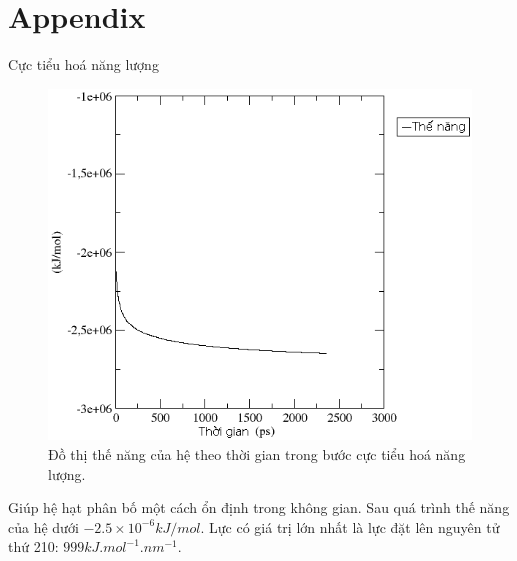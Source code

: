 \documentclass[10pt]{beamer}
\begin{document}
\section*{Appendix}
	\begin{frame}{Cực tiểu hoá năng lượng}
		\begin{figure}[h]
		\centering
		\includegraphics[height=0.35\textheight,natwidth=610,natheight=642]{../25energy}
		\caption{Đồ thị thế năng của hệ theo thời gian trong bước cực tiểu hoá năng lượng.}
		\label{fig:em}
		\end{figure}
		Giúp hệ hạt phân bố một cách ổn định trong không gian. Sau quá trình thế năng của hệ dưới $-2.5\times 10^{-6} kJ/mol$. Lực có giá trị lớn nhất là lực đặt lên nguyên tử thứ 210: $999 kJ.mol^{-1}.nm^{-1}$.
	\end{frame}
	
\end{document}
